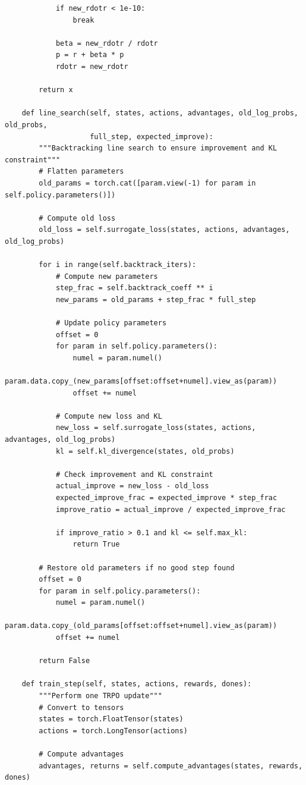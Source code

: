 \documentclass[12pt]{article}
\begin{document}
{{\begin{verbatim}
            if new_rdotr < 1e-10:
                break

            beta = new_rdotr / rdotr
            p = r + beta * p
            rdotr = new_rdotr

        return x

    def line_search(self, states, actions, advantages, old_log_probs, old_probs,
                    full_step, expected_improve):
        """Backtracking line search to ensure improvement and KL constraint"""
        # Flatten parameters
        old_params = torch.cat([param.view(-1) for param in self.policy.parameters()])

        # Compute old loss
        old_loss = self.surrogate_loss(states, actions, advantages, old_log_probs)

        for i in range(self.backtrack_iters):
            # Compute new parameters
            step_frac = self.backtrack_coeff ** i
            new_params = old_params + step_frac * full_step

            # Update policy parameters
            offset = 0
            for param in self.policy.parameters():
                numel = param.numel()
                param.data.copy_(new_params[offset:offset+numel].view_as(param))
                offset += numel

            # Compute new loss and KL
            new_loss = self.surrogate_loss(states, actions, advantages, old_log_probs)
            kl = self.kl_divergence(states, old_probs)

            # Check improvement and KL constraint
            actual_improve = new_loss - old_loss
            expected_improve_frac = expected_improve * step_frac
            improve_ratio = actual_improve / expected_improve_frac

            if improve_ratio > 0.1 and kl <= self.max_kl:
                return True

        # Restore old parameters if no good step found
        offset = 0
        for param in self.policy.parameters():
            numel = param.numel()
            param.data.copy_(old_params[offset:offset+numel].view_as(param))
            offset += numel

        return False

    def train_step(self, states, actions, rewards, dones):
        """Perform one TRPO update"""
        # Convert to tensors
        states = torch.FloatTensor(states)
        actions = torch.LongTensor(actions)

        # Compute advantages
        advantages, returns = self.compute_advantages(states, rewards, dones)


\end{verbatim}}}
\end{document}
